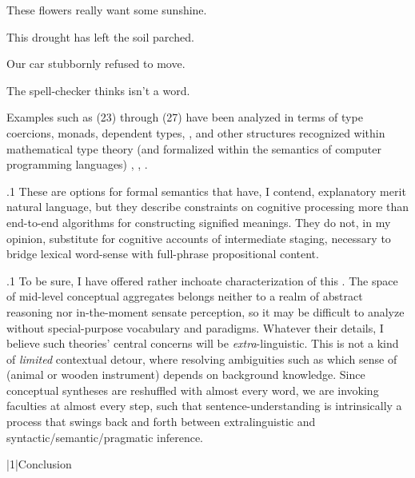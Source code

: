 \documentclass[11pt, twocolumn]{article}
\begin{document}
{{{\begin{exsGroup}

\exsItem{}  These flowers really want some sunshine.

\exsItem{}  This drought has left the soil parched.

\exsItem{}  Our car stubbornly refused to move.

\exsItem{}  The spell-checker thinks  isn't a word.\vspace{2pt}

\end{exsGroup}

\nip{}%
Examples such as \exsRef(23) through \exsRef(27) have been analyzed in terms of
type coercions, monads, dependent types, , and
other structures recognized within mathematical type theory (and
formalized within the semantics of computer programming languages)
, , .
}%

\p.1{%
These are options for formal semantics that have, I contend,
explanatory merit \visavis{} natural language, but they describe
constraints on cognitive processing more than end-to-end
algorithms for constructing signified meanings.
They do not, in my opinion, substitute for cognitive
accounts of intermediate staging, necessary
to bridge lexical word-sense with full-phrase propositional content.
}%

\p.1{%
To be sure, I have offered rather inchoate characterization
of this . The space of mid-level conceptual
aggregates belongs neither to a realm of abstract reasoning nor
in-the-moment sensate perception, so it may be difficult to
analyze without special-purpose vocabulary and paradigms.
Whatever their details, I believe such theories' central
concerns will be \textit{extra}-linguistic. This is not a kind
of \textit{limited} contextual detour, where resolving
ambiguities such as which sense of  (animal or wooden instrument) depends on
background knowledge. Since conceptual syntheses are
reshuffled with almost every word, we are
invoking  faculties at almost every
step, such that sentence-understanding is intrinsically a
process that swings back and forth between
extralinguistic and syntactic/semantic/pragmatic
inference. \vspace{4pt} \enlargethispage{5pt}
}%


\s|1|{Conclusion}

}}
\end{document}
